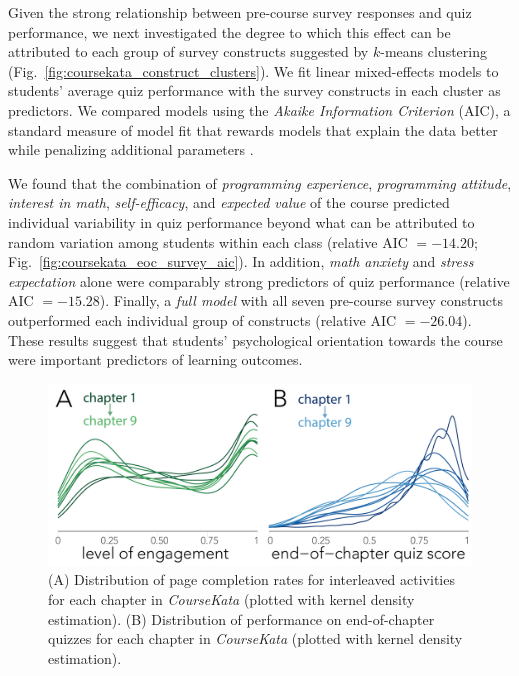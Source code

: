 \documentclass[10pt,letterpaper]{article}
\newcommand{\ck}{\textit{CourseKata}}
\begin{document}
Given the strong relationship between pre-course survey responses and quiz performance, we next investigated the degree to which this effect can be attributed to each group of survey constructs suggested by $k$-means clustering (Fig.~\ref{fig:coursekata_construct_clusters}).
We fit linear mixed-effects models to students' average quiz performance with the survey constructs in each cluster as predictors.
We compared models using the \textit{Akaike Information Criterion} (AIC), a standard measure of model fit that rewards models that explain the data better while penalizing additional parameters \cite{akaike1974new}.

We found that the combination of \textit{programming experience}, \textit{programming attitude}, \textit{interest in math}, \textit{self-efficacy}, and \textit{expected value} of the course predicted individual variability in quiz performance beyond what can be attributed to random variation among students within each class (relative AIC $=-14.20$; Fig.~\ref{fig:coursekata_eoc_survey_aic}). %
In addition, \textit{math anxiety} and \textit{stress expectation} alone were comparably strong predictors of quiz performance (relative AIC $=-15.28$). %
Finally, a \textit{full model} with all seven pre-course survey constructs outperformed each individual group of constructs (relative AIC $=-26.04$). %
These results suggest that students' psychological orientation towards the course were important predictors of learning outcomes.

\begin{figure}[t]
\centering    \includegraphics[width=0.99\linewidth]{figures_cogsci/2023_coursekata_kde_chapters_distribution.pdf}
    \caption{(A) Distribution of page completion rates for interleaved activities for each chapter in \ck{} (plotted with kernel density estimation). 
    (B) Distribution of performance on end-of-chapter quizzes for each chapter in \ck{} (plotted with kernel density estimation).}
    \label{fig:summary}
\end{figure}
\end{document}

